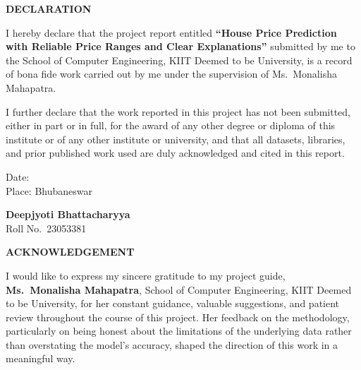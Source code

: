 \documentclass[12pt]{report}
\begin{document}
\newpage
\thispagestyle{fancy}
\begin{center}
{\large \textbf{DECLARATION}}
\end{center}
\vspace{0.6cm}

I hereby declare that the project report entitled \textbf{``House Price
Prediction with Reliable Price Ranges and Clear Explanations''} submitted by
me to the School of Computer Engineering, KIIT Deemed to be University, is a
record of bona fide work carried out by me under the supervision of Ms.\
Monalisha Mahapatra.

I further declare that the work reported in this project has not been
submitted, either in part or in full, for the award of any other degree or
diploma of this institute or of any other institute or university, and that
all datasets, libraries, and prior published work used are duly acknowledged
and cited in this report.

\vspace{2cm}
\noindent
\begin{minipage}[t]{0.45\textwidth}
Date: \\
Place: Bhubaneswar
\end{minipage}
\hfill
\begin{minipage}[t]{0.45\textwidth}
\raggedleft
\textbf{Deepjyoti Bhattacharyya} \\
Roll No.\ 23053381
\end{minipage}

\newpage
\thispagestyle{fancy}
\begin{center}
{\large \textbf{ACKNOWLEDGEMENT}}
\end{center}
\vspace{0.6cm}

I would like to express my sincere gratitude to my project guide, \textbf{Ms.\
Monalisha Mahapatra}, School of Computer Engineering, KIIT Deemed to be
University, for her constant guidance, valuable suggestions, and patient
review throughout the course of this project. Her feedback on the
methodology, particularly on being honest about the limitations of the
underlying data rather than overstating the model's accuracy, shaped the
direction of this work in a meaningful way.
\end{document}
